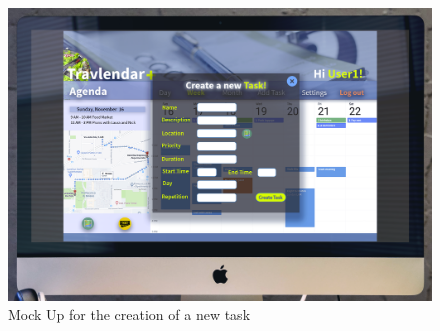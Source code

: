 \begin{figure}[H]
    \centering
    \includegraphics[scale=0.2]{Pictures/UXDiagram/desktopMockUpAddTask.png}
    \caption{Mock Up for the creation of a new task}
    \label{fig:addTaskMockUp}
\end{figure}